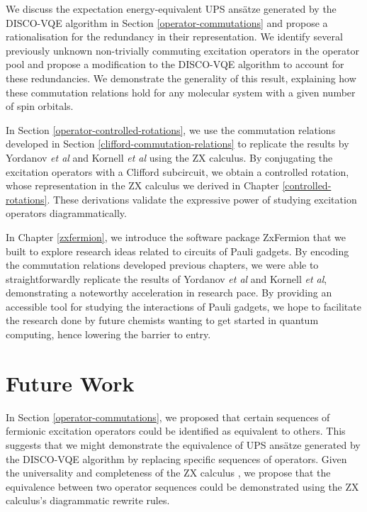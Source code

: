 We discuss the expectation energy-equivalent UPS ansätze generated by the DISCO-VQE algorithm in Section \ref{operator-commutations} and propose a rationalisation for the redundancy in their representation. We identify several previously unknown non-trivially commuting excitation operators in the operator pool and propose a modification to the DISCO-VQE algorithm to account for these redundancies. We demonstrate the generality of this result, explaining how these commutation relations hold for any molecular system with a given number of spin orbitals.

In Section \ref{operator-controlled-rotations}, we use the commutation relations developed in Section \ref{clifford-commutation-relations} to replicate the results by Yordanov \textit{et al} and Kornell \textit{et al} using the ZX calculus. By conjugating the excitation operators with a Clifford subcircuit, we obtain a controlled rotation, whose representation in the ZX calculus we derived in Chapter \ref{controlled-rotations}. These derivations validate the expressive power of studying excitation operators diagrammatically.

In Chapter \ref{zxfermion}, we introduce the software package ZxFermion that we built to explore research ideas related to circuits of Pauli gadgets. By encoding the commutation relations developed previous chapters, we were able to straightforwardly replicate the results of Yordanov \textit{et al} and Kornell \textit{et al}, demonstrating a noteworthy acceleration in research pace. By providing an accessible tool for studying the interactions of Pauli gadgets, we hope to facilitate the research done by future chemists wanting to get started in quantum computing, hence lowering the barrier to entry.

\section{Future Work}

In Section \ref{operator-commutations}, we proposed that certain sequences of fermionic excitation operators could be identified as equivalent to others. This suggests that we might demonstrate the equivalence of UPS ansätze generated by the DISCO-VQE algorithm by replacing specific sequences of operators. Given the universality and completeness of the ZX calculus \cite{Coecke2011}, we propose that the equivalence between two operator sequences could be demonstrated using the ZX calculus's diagrammatic rewrite rules.

